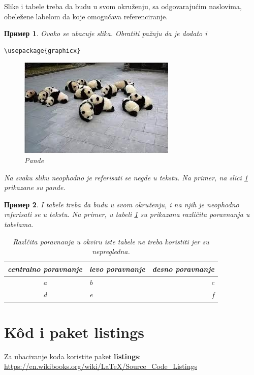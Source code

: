 \documentclass[a4paper]{article}
\newtheorem{primer}{Пример}[section] %
\begin{document}
Slike i tabele treba da budu u svom okruženju, sa odgovarajućim naslovima, obeležene labelom da koje omogućava referenciranje. 

\begin{primer} Ovako se ubacuje slika. Obratiti pažnju da je dodato i 
\begin{verbatim}
\usepackage{graphicx}
\end{verbatim}

\begin{figure}[h!]
\begin{center}
\includegraphics[scale=0.75]{panda.jpg}
\end{center}
\caption{Pande}
\label{fig:pande}
\end{figure}

Na svaku sliku neophodno je referisati se negde u tekstu. Na primer, na slici \ref{fig:pande} prikazane su pande. 
\end{primer}

\begin{primer} I tabele treba da budu u svom okruženju, i na njih je neophodno referisati se u tekstu. Na primer, u tabeli \ref{tab:tabela1} su prikazana različita poravnanja u tabelama.

\begin{table}[h!]
\begin{center}
\caption{Razlčita poravnanja u okviru iste tabele ne treba koristiti jer su nepregledna.}
\begin{tabular}{|c|l|r|} \hline
centralno poravnanje& levo poravnanje& desno poravnanje\\ \hline
a &b&c\\ \hline
d &e&f\\ \hline
\end{tabular}
\label{tab:tabela1}
\end{center}
\end{table}

\end{primer}

\section{K\^{o}d i paket listings}
Za ubacivanje koda koristite paket \textbf{listings}:
\url{https://en.wikibooks.org/wiki/LaTeX/Source_Code_Listings}
\end{document}
